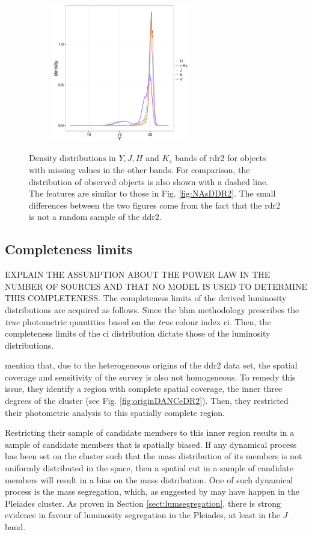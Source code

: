 \begin{figure}[ht!]
\begin{subfigure}[t]{0.45\textwidth}
      \includegraphics[page=4,height=6cm]{background/Figures/MissingDistributions.pdf}
    \end{subfigure}
\caption{Density distributions in $Y,J,H$ and $K_s$ bands of \gls{rdr2} for objects with missing values in the other bands. For comparison, the distribution of observed objects is also shown with a dashed line. The features are similar to those in Fig. \ref{fig:NAsDDR2}. The small differences between the two figures come from the fact that the \gls{rdr2} is not a random sample of the \gls{ddr2}.}
\label{fig:NAs}
\end{figure}


\subsection{Completeness limits}
\label{sect:ddr2_completeness}

EXPLAIN THE ASSUMPTION ABOUT THE POWER LAW IN THE NUMBER OF SOURCES AND THAT NO MODEL IS USED TO DETERMINE THIS COMPLETENESS.
The completeness limits of the derived luminosity distributions are acquired as follows. Since the \gls{bhm} methodology prescribes the \emph{true} photometric quantities based on the \emph{true} colour index \gls{ci}. Then, the completeness limits of the \gls{ci} distribution dictate those of the luminosity distributions. 

\citet{Bouy2015} mention that, due to the heterogeneous origins of the \gls{ddr2} data set, the spatial coverage and sensitivity of the survey is also not homogeneous. To remedy this issue, they identify a region with complete spatial coverage, the inner three degrees of the cluster (see Fig. \ref{fig:originDANCeDR2}). Then, they restricted their photometric analysis to this spatially complete region. 

Restricting their sample of candidate members to this inner region results in a sample of candidate members that is spatially biased. If any dynamical process has been set on the cluster such that the mass distribution of its members is not uniformly distributed in the space, then a spatial cut in a sample of candidate members will result in a bias on the mass distribution. One of such dynamical process is the mass segregation, which, as suggested by \citet{Adams2001} may have happen in the Pleiades cluster. As proven in Section \ref{sect:lumsegregation}, there is strong evidence in favour of luminosity segregation in the Pleiades, at least in the $J$ band.

